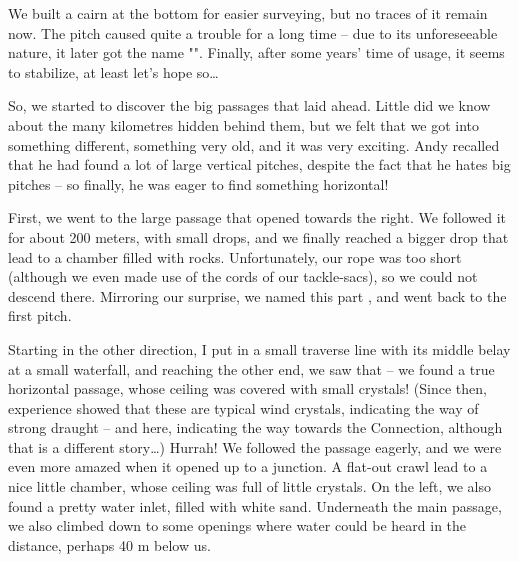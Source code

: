 We built a cairn at the bottom for easier surveying, but no traces of it remain now. The pitch caused quite a trouble for a long time -- due to its unforeseeable nature, it later got the name "". Finally, after some years' time of usage, it seems to stabilize, at least let's hope so\ldots{}

So, we started to discover the big passages that laid ahead. Little did we know about the many kilometres hidden behind them, but we felt that we got into something different, something very old, and it was very exciting. Andy recalled that he had found a lot of large vertical pitches, despite the fact that he hates big pitches -- so finally, he was eager to find something horizontal!


First, we went to the large passage that opened towards the right. We followed it for about 200 meters, with small drops, and we finally reached a bigger drop that lead to a chamber filled with rocks.
Unfortunately, our rope was too short (although we even made use of the cords of our tackle-sacs), so we could not descend there. Mirroring our surprise, we named this part , and went back to the first pitch.

Starting in the other direction, I put in a small traverse line with its middle belay at a small waterfall, and reaching the other end, we saw
that  -- we found a true horizontal passage, whose ceiling was covered with small crystals! (Since then,
experience showed that these are typical wind crystals, indicating the way of strong draught -- and here, indicating the way towards the
Connection, although that is a different story\ldots{}) Hurrah! We followed the passage eagerly, and we were even more amazed when it
opened up to a junction. A flat-out crawl lead to a nice little chamber,
whose ceiling was full of little crystals. On the left, we also found a
pretty water inlet, filled with white sand. Underneath the main passage,
we also climbed down to some openings where water could be heard in the distance, perhaps 40 m below us.


